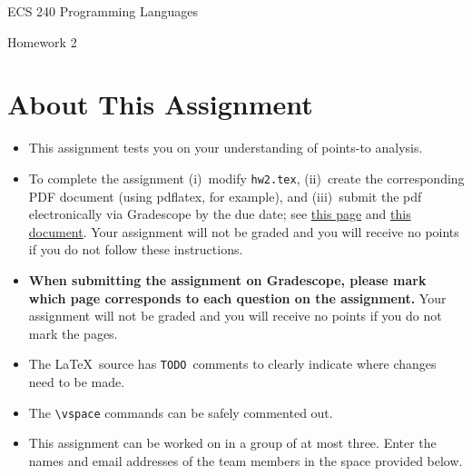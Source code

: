 \documentclass[12pt]{article}
\begin{document}

    \begin{center}
        \bigskip
        {\LARGE ECS 240 Programming Languages} \medskip
                
        {\Large Homework 2} \bigskip
    
    \end{center}

    \section*{About This Assignment}
    
    \begin{itemize}
      \item This assignment tests you on your understanding of points-to analysis.
      \item To complete the assignment (i)~modify \texttt{hw2.tex}, (ii)~create
      the corresponding PDF document (using pdflatex, for example), and
      (iii)~submit the pdf electronically via Gradescope by the due date; see
      \href{https://www.gradescope.com/get_started#student-submission}{this page}
      and
      \href{http://gradescope-static-assets.s3-us-west-2.amazonaws.com/help/submitting_hw_guide.pdf}{this
      document}. Your assignment will not be graded and you will receive no
      points if you do not follow these instructions. 

      \item \textbf{When submitting the assignment on Gradescope, please mark
      which page corresponds to each question on the assignment.}  Your
      assignment will not be graded and you will receive no points if you do not
      mark the pages.      

      \item The  \LaTeX\ source has \texttt{TODO}~comments to clearly indicate
      where changes need to be made. 
      \item The \verb=\vspace= commands can be safely commented out.
      \item This assignment can be worked on in a group of at most three. Enter
      the names and email addresses of the team members in the space provided
      below.
    \end{itemize}
\end{document}
